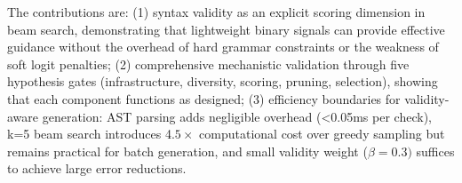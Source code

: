 The contributions are: (1) syntax validity as an explicit scoring dimension in beam search, demonstrating that lightweight binary signals can provide effective guidance without the overhead of hard grammar constraints or the weakness of soft logit penalties; (2) comprehensive mechanistic validation through five hypothesis gates (infrastructure, diversity, scoring, pruning, selection), showing that each component functions as designed; (3) efficiency boundaries for validity-aware generation: AST parsing adds negligible overhead (<0.05ms per check), k=5 beam search introduces 4.$5\times$ computational cost over greedy sampling but remains practical for batch generation, and small validity weight ($\beta =0.3)$ suffices to achieve large error reductions.

